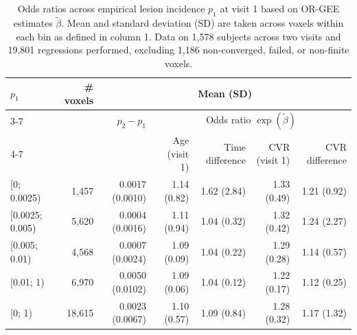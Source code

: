 \begin{table}[htbp]
\centering
\caption{Odds ratios across empirical lesion incidence $p_1$ at visit 1 based on OR-GEE estimates $\tilde{\beta}$. Mean and standard deviation (SD) are taken across voxels within each bin as defined in column 1. Data on 1,578 subjects across two visits and 19,801 regressions performed, excluding 1,186 non-converged, failed, or non-finite voxels.}
\label{tab:or-gee-odds-ratio-by-incidence}
\setlength{\tabcolsep}{5pt}
\renewcommand{\arraystretch}{1.12}
\begin{tabular}{|l|r|r|rrrr|}
\hline
$p_1$ & \# voxels & \multicolumn{5}{c|}{Mean (SD)} \\
\cline{3-7}
& & $p_2 - p_1$ & \multicolumn{4}{c|}{Odds ratio $\exp(\tilde{\beta})$} \\
\cline{4-7}
& & & Age (visit 1) & Time difference & CVR (visit 1) & CVR difference \\
\hline
[0; 0.0025) & 1,457 & 0.0017 (0.0010) & 1.14 (0.82) & 1.62 (2.84) & 1.33 (0.49) & 1.21 (0.92) \\
[0.0025; 0.005) & 5,620 & 0.0004 (0.0016) & 1.11 (0.94) & 1.04 (0.32) & 1.32 (0.42) & 1.24 (2.27) \\
[0.005; 0.01) & 4,568 & 0.0007 (0.0024) & 1.09 (0.09) & 1.04 (0.22) & 1.29 (0.28) & 1.14 (0.57) \\
[0.01; 1) & 6,970 & 0.0050 (0.0102) & 1.09 (0.06) & 1.04 (0.12) & 1.22 (0.17) & 1.12 (0.25) \\
\hline
[0; 1) & 18,615 & 0.0023 (0.0067) & 1.10 (0.57) & 1.09 (0.84) & 1.28 (0.32) & 1.17 (1.32) \\
\hline
\end{tabular}
\end{table}
